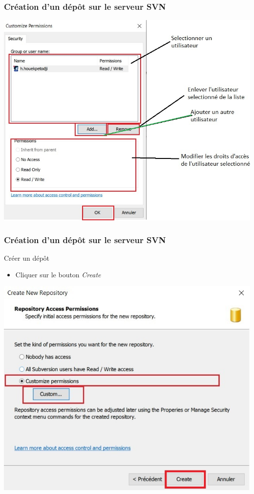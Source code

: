 \documentclass{beamer}
\begin{document}
\begin{frame}
\frametitle{Création d'un dépôt sur le serveur SVN}
\includegraphics[scale=.5]{../images/server12.jpg}
\end{frame}

\begin{frame}
\frametitle{Création d'un dépôt sur le serveur SVN}
\begin{block}{Créer un dépôt}
\begin{itemize}
\item Cliquer sur le bouton \alert{\textit{Create}}
\end{itemize}
\end{block}
\includegraphics[scale=.5]{../images/server13.jpg}
\end{frame}
\end{document}
